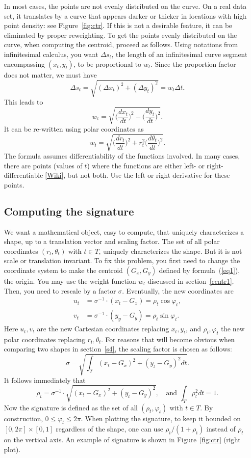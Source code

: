 \documentclass[oneside,10pt]{book}
\begin{document}
In most cases, the points are not evenly distributed on the curve. On a real data set, it translates by a curve that appears darker or thicker in locations with high point density: see Figure~\ref{fig:ctr}. If this is not a desirable feature, it can be eliminated by proper reweighting. To get the points evenly distributed on the curve, when computing the centroid, proceed as follows. Using notations from infinitesimal calculus, you want $\Delta s_t$, the length of an infinitesimal curve segment encompassing $(x_t,y_t)$, to be proportional to $w_t$. Since the proportion factor does not matter, we must have
$$\Delta s_t = \sqrt{(\Delta x_t)^2 +(\Delta y_t)^2}= w_t \Delta t.$$
This leads to
$$w_t = \sqrt{\Big(\frac{dx_t}{dt}\Big)^2 + \Big(\frac{dy_t}{dt}\Big)^2}.$$
It can be re-written using polar coordinates as
$$w_t=\sqrt{\Big(\frac{dr_t}{dt}\Big)^2 + r_t^2\Big(\frac{d\theta_t}{dt}\Big)^2}.$$
The formula assumes differentiability of the functions involved. In many cases, there are points (values of $t$) where the functions are either left- or right-differentiable [\href{https://en.wikipedia.org/wiki/Semi-differentiability}{Wiki}], but not both. Use the left or right derivative for these points.


\subsection{Computing the signature}

We want a mathematical object, easy to compute, that uniquely characterizes a shape, up to a translation vector and scaling factor. The set of all polar coordinates $(r_t,\theta_t)$ with $t\in T$, uniquely characterizes the shape. But it is not scale or translation invariant. To fix this problem, you first need to change the coordinate system to make the centroid $(G_x, G_y)$ defined by formula~(\ref{eq1}), the origin. You may use the weight function $w_t$ discussed in section~\ref{centr1}.  Then, you need to rescale by a factor $\sigma$. Eventually, the new coordinates are
\begin{align}
u_t & = \sigma^{-1} \cdot (x_t-G_x) = \rho_t \cos\varphi_t, \nonumber \\
v_t & = \sigma^{-1} \cdot (y_y-G_y) = \rho_t \sin\varphi_t. \nonumber
\end{align}
Here $u_t,v_t$ are the new Cartesian coordinates replacing $x_t, y_t$, and $\rho_t,\varphi_t$ the new polar coordinates replacing $r_t,\theta_t$. For reasons that will become obvious
when comparing two shapes in section~\ref{s4}, the scaling factor is chosen as follows:
$$\sigma = \sqrt{\int_T (x_t-G_x)^2 + (y_t-G_y)^2 dt}.$$
It follows immediately that
\begin{equation}
\rho_t =\sigma^{-1}\cdot\sqrt{(x_t-G_x)^2 + (y_t-G_y)^2}, \quad \text{and }\int_T \rho^2_t dt = 1. \label{eq3}
\end{equation}
Now the signature is defined as the set of all $(\rho_t,\varphi_t)$ with $t\in T$. By construction, $0\leq \varphi_t\leq 2\pi$. When plotting the signature, to keep it  bounded on $[0, 2\pi] \times [0, 1]$ regardless of the shape, one can use $\rho_t/(1+\rho_t)$ instead of $\rho_t$ on the vertical axis. An example of signature is shown in Figure~\ref{fig:ctr} (right plot).
\end{document}
